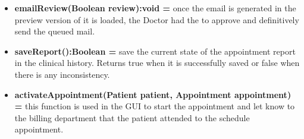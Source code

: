 \documentclass{article}
\begin{document}
\begin{itemize}
                \item \textbf{emailReview(Boolean review):void = } once the email is generated in the preview version of it is loaded, the Doctor had the to approve and definitively send the queued mail.
                \item \textbf{saveReport():Boolean = } save the current state of the appointment report in the clinical history. Returns true when it is successfully saved or false when there is any inconsistency.
                \item \textbf{activateAppointment(Patient patient, Appointment appointment) = } this function is used in the GUI to start the appointment and let know to the billing department that the patient attended to the schedule appointment.
            \end{itemize}
            
\end{document}
